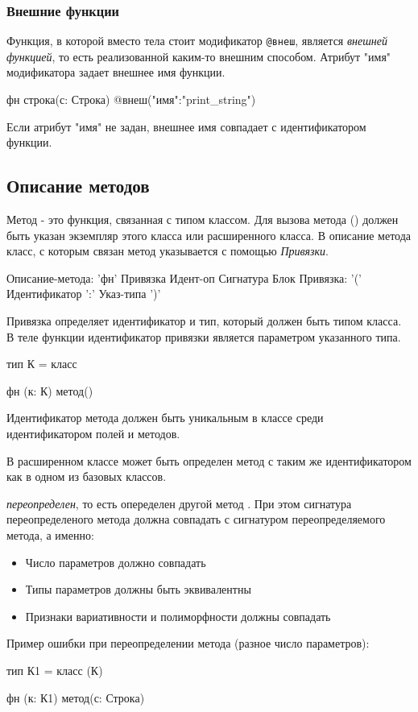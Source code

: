 \hypertarget{extern-fn}{%
\subsubsection{Внешние функции}\label{decls:extern-fn}}

Функция, в которой вместо тела стоит модификатор \verb|@внеш|, является \emph{внешней функцией}, то есть реализованной каким-то внешним способом.
Атрибут "имя" модификатора задает внешнее имя функции.

\begin{Trivil}
фн строка(с: Строка) @внеш("имя":"print_string")
\end{Trivil}

Если атрибут "имя" не задан, внешнее имя совпадает с идентификатором функции.

\hypertarget{methods}{%
\subsection{Описание методов}\label{decls:methods}}

Метод - это функция, связанная с типом классом. Для вызова метода () должен быть указан экземпляр этого класса или расширенного класса. 
В описание метода класс, с которым связан метод указывается с помощью \emph{Привязки}.

\begin{Grammar}
Описание-метода: 'фн' Привязка Идент-оп Сигнатура Блок
Привязка: '(' Идентификатор ':' Указ-типа ')'
\end{Grammar} 

Привязка определяет идентификатор и тип, который должен быть типом класса. В теле функции идентификатор привязки является параметром указанного типа.

\begin{Trivil}
тип К = класс {}

фн (к: К) метод() {}
\end{Trivil}

Идентификатор метода должен быть уникальным в классе среди идентификатором полей и методов. 

В расширенном классе может быть определен метод с таким же идентификатором как в одном из базовых классов.

\emph{переопределен}, то есть опеределен другой метод . При этом сигнатура переопределеного метода должна совпадать с сигнатуром переопределяемого метода, а именно:
\begin{itemize}
\item
    Число параметров должно совпадать
\item
    Типы  параметров должны быть эквивалентны 
\item 
    Признаки вариативности и полиморфности должны совпадать
\end{itemize}

Пример ошибки при переопределении метода (разное число параметров):
\begin{SampleErr}[vspace=2pt]
тип К1 = класс (К) {}

фн (к: К1) метод(с: Строка) {}
\end{SampleErr}